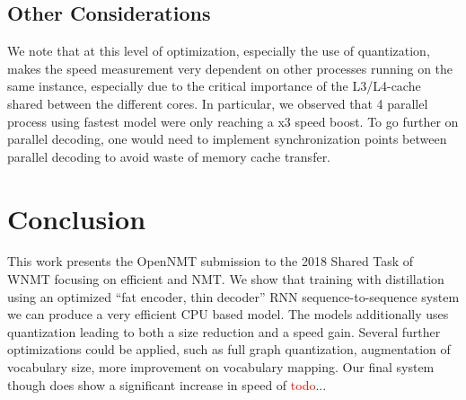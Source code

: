 \documentclass[11pt,a4paper]{article}
\begin{document}
\subsection{Other Considerations}

We  note that at this level of optimization, especially the use
of quantization, makes the speed measurement very dependent on other
processes running on the same instance, especially due to the critical
importance of the L3/L4-cache shared between the different cores. In
particular, we observed that 4 parallel process using fastest model
were only reaching a x3 speed boost. To go further on parallel
decoding, one would need to implement synchronization points between
parallel decoding to avoid waste of memory cache transfer.


\section{Conclusion}

This work presents the OpenNMT submission to the 2018 Shared Task of
WNMT focusing on efficient and NMT. We show that training with
distillation using an optimized ``fat encoder, thin decoder'' RNN
sequence-to-sequence system we can produce a very efficient CPU based
model. The models additionally uses quantization leading to both a
size reduction and a speed gain. Several further optimizations
could be applied, such as full graph quantization, augmentation
of vocabulary size, more improvement on vocabulary mapping. Our final system though does show a significant increase in speed of \textcolor{red}{todo}...


%

%
%


\end{document}
